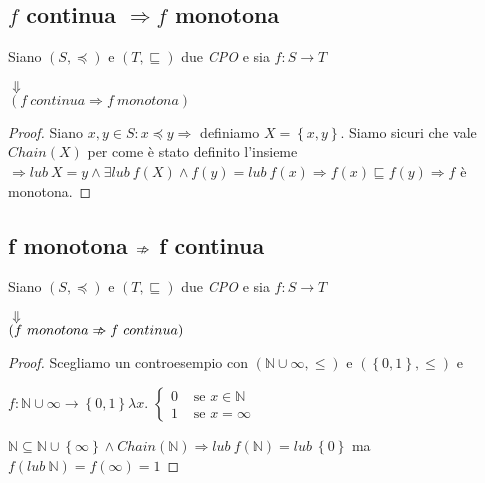 \subsection{$f$  continua $\Rightarrow f$  monotona}
\begin{esercizio}
  Siano $(S, \preceq)$ e $(T, \sqsubseteq)$ due \emph{CPO} e sia $f: S \rightarrow T $
  \begin{center}
    $\Downarrow$\\
    $(f\ continua \Rightarrow f\ monotona)$
  \end{center}
  \begin{proof}
    Siano $x,y \in S : x \preceq y \Rightarrow $ definiamo $X = \left\{x,y\right\}$. Siamo sicuri che vale $Chain(X)$ per come è stato definito l'insieme $\Rightarrow lub\ X = y \land \exists lub\ f(X) \land f(y) = lub\ f(x) \Rightarrow f(x) \sqsubseteq f(y) \Rightarrow f$ è monotona.
  \end{proof}
\end{esercizio}


\subsection{f monotona $\Arrownot \Rightarrow$ f continua}
\begin{esercizio}
  Siano $(S, \preceq)$ e $(T, \sqsubseteq)$ due \emph{CPO} e sia $f: S \rightarrow T$
  \begin{center}
    $\Downarrow$\\
    $(f\ monotona \Arrownot \Rightarrow f\ continua)$
  \end{center}
  \begin{proof}
    Scegliamo un controesempio con $(\mathbb{N} \cup \infty, \leq)$ e $(\left\{0,1\right\},\leq)$ e
    \begin{center}
      $f: \mathbb{N} \cup \infty \rightarrow \left\{0,1\right\} \lambda x.$
      $\begin{cases}
        0 & \text{ se } x \in \mathbb{N}
        \\
        1 & \text{ se } x = \infty
      \end{cases}
      $
    \end{center}
    $\mathbb{N} \subseteq \mathbb{N} \cup \left\{\infty\right\} \land Chain(\mathbb{N}) \Rightarrow lub\ f(\mathbb{N}) = lub\ \left\{0\right\}$ ma $f(lub\ \mathbb{N}) = f(\infty) = 1$
  \end{proof}
\end{esercizio}

